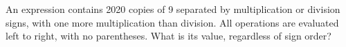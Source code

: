 An expression contains 2020 copies of 9 separated by multiplication or division signs, with one more multiplication than division. All operations are evaluated left to right, with no parentheses. What is its value, regardless of sign order?
